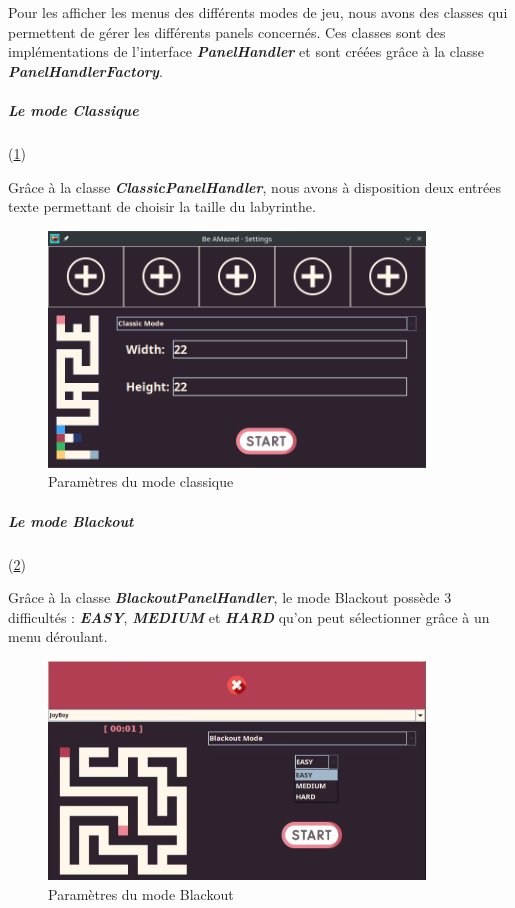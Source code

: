 Pour les afficher les menus des différents modes de jeu, nous avons des classes qui permettent de gérer les différents panels concernés. Ces classes sont des implémentations de l'interface  \textbf{\textit{PanelHandler}} et sont créées grâce à la classe  \textbf{\textit{PanelHandlerFactory}}.

\subparagraph*{Le mode Classique} (\ref{fig:ClassicMode})

Grâce à la classe \textbf{\textit{ClassicPanelHandler}}, nous avons à disposition deux entrées texte permettant de choisir la taille du labyrinthe.

\begin{figure}[h!]
    \centering
    \includegraphics[width=10cm]{ressources/Implementation/Labyrinthe/Controleur/SettingsMenu_ClassicMode.png}
    \caption{Paramètres du mode classique}
    \label{fig:ClassicMode}
\end{figure}
\FloatBarrier

\subparagraph*{Le mode Blackout} (\ref{fig:BlackoutModeDifficulty})

Grâce à la classe \textbf{\textit{BlackoutPanelHandler}}, le mode Blackout possède 3 difficultés : \textbf{\textit{EASY}}, \textbf{\textit{MEDIUM}} et \textbf{\textit{HARD}} qu'on peut sélectionner grâce à un menu déroulant.

\begin{figure}[h!]
    \centering
    \includegraphics[width=10cm]{ressources/Implementation/Labyrinthe/Controleur/SettingsMenu_BlackoutMode_Difficulty.png}
    \caption{Paramètres du mode Blackout}
    \label{fig:BlackoutModeDifficulty}
\end{figure}
\FloatBarrier

